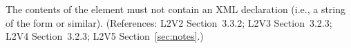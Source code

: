 The contents of the  element must not contain an XML
declaration (i.e., a string of the form  or similar).  (References: L2V2 Section~3.3.2;
L2V3 Section~3.2.3; L2V4 Section~3.2.3; L2V5 Section~\ref{sec:notes}.)
